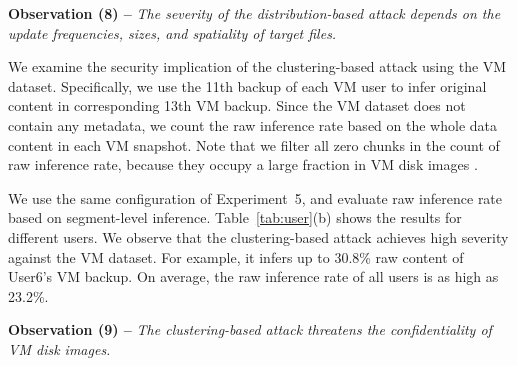 {\bf Observation (8) --} {\em The severity of the distribution-based attack depends on the update frequencies, sizes, and spatiality of target files. } 

We examine the security implication of the clustering-based attack using the
VM dataset. Specifically, we use the 11th  backup of each VM user  to infer original content in corresponding 13th VM
backup. Since the VM dataset does not contain any metadata, we count the raw
inference rate based on the  whole data content in each VM snapshot.
Note that we filter all zero chunks in the count of raw inference rate,
because they occupy a large fraction in VM disk images \cite{jin09}.           



We use the same configuration of Experiment~5, and evaluate raw inference rate
based on segment-level inference.  Table~\ref{tab:user}(b) shows the results
for different users.  We observe that the clustering-based attack achieves high
severity against the VM dataset. For example, it infers up to 30.8\% raw
content of User6's VM backup. On average, the raw inference rate of all users
is as high as 23.2\%.  

{\bf Observation (9) --} {\em The clustering-based attack threatens the
confidentiality of VM disk images. } 

